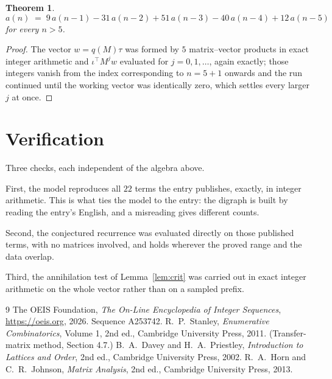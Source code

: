 \documentclass[11pt,a4paper]{article}
\theoremstyle{plain}
\newtheorem{theorem}{Theorem}
\theoremstyle{definition}
\begin{document}
\begin{theorem}
\[
a(n)\;=\;9\,a(n-1) - 31\,a(n-2) + 51\,a(n-3) - 40\,a(n-4) + 12\,a(n-5)
\]
for every $n>5$.
\end{theorem}

\begin{proof}
The vector $w=q(M)\tau$ was formed by $5$ matrix--vector products in exact integer
arithmetic and $\iota^{\!\top}M^{j}w$ evaluated for $j=0,1,\dots$, again exactly; those
integers vanish from the index corresponding to $n=5+1$ onwards and the run continued
until the working vector was identically zero, which settles every larger $j$ at once.
\end{proof}

\section{Verification}

Three checks, each independent of the algebra above.

First, the model reproduces all $22$ terms the entry publishes, exactly, in integer
arithmetic. This is what ties the model to the entry: the digraph is built by reading the
entry's English, and a misreading gives different counts.

Second, the conjectured recurrence was evaluated directly on those published terms, with no
matrices involved, and holds wherever the proved range and the data overlap.

Third, the annihilation test of Lemma~\ref{lem:crit} was carried out in exact integer
arithmetic on the whole vector rather than on a sampled prefix.

\begin{thebibliography}{9}
 The OEIS Foundation, \emph{The On-Line Encyclopedia of Integer
Sequences}, \url{https://oeis.org}, 2026. Sequence A253742.
 R.~P.~Stanley, \emph{Enumerative Combinatorics}, Volume 1, 2nd ed.,
Cambridge University Press, 2011. (Transfer-matrix method, Section 4.7.)
 B.~A.~Davey and H.~A.~Priestley, \emph{Introduction to Lattices and
Order}, 2nd ed., Cambridge University Press, 2002.
 R.~A.~Horn and C.~R.~Johnson, \emph{Matrix Analysis}, 2nd ed., Cambridge
University Press, 2013.
\end{thebibliography}
\end{document}
